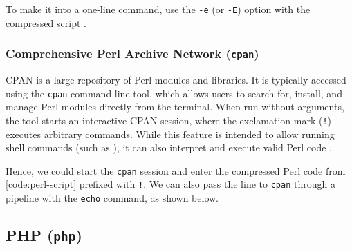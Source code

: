 

To make it into a one-line command, use the \texttt{-e} (or \texttt{-E}) option with the compressed script \cite{perl-man}.


\subsubsection{Comprehensive Perl Archive Network (\texttt{cpan})}
\label{sec:cpan}


CPAN is a large repository of Perl modules and libraries. It is typically accessed using the \texttt{cpan} command-line tool, which allows users to search for, install, and manage Perl modules directly from the terminal. When run without arguments, the tool starts an interactive CPAN session, where the exclamation mark (\texttt{!}) executes arbitrary commands. While this feature is intended to allow running shell commands (such as ), it can also interpret and execute valid Perl code \cite{cpan-man}.

Hence, we could start the \texttt{cpan} session and enter the compressed Perl code from \cref{code:perl-script} prefixed with \texttt{!}. We can also pass the line to \texttt{cpan} through a pipeline with the \texttt{echo} command, as shown below.



\subsection{PHP (\texttt{php})}


